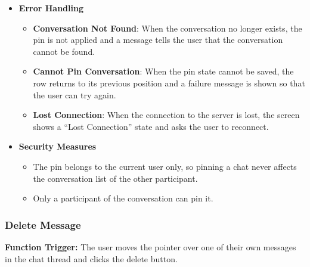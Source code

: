 \begin{itemize}[leftmargin=1.6em,topsep=4pt,itemsep=3pt,parsep=0pt,label=$\bullet$]
        \begin{itemize}[leftmargin=2.2em,topsep=2pt,itemsep=3pt,parsep=0pt,label=$\circ$]
            \item The pinned conversation stays at the top of the conversation list of the current user.
            \item The content of the conversation and the messages are not changed by this action.
        \end{itemize}
    \item \textbf{Error Handling}

        \begin{itemize}[leftmargin=2.2em,topsep=2pt,itemsep=3pt,parsep=0pt,label=$\circ$]
            \item \textbf{Conversation Not Found}: When the conversation no longer exists, the pin is not applied and a message tells the user that the conversation cannot be found.
            \item \textbf{Cannot Pin Conversation}: When the pin state cannot be saved, the row returns to its previous position and a failure message is shown so that the user can try again.
            \item \textbf{Lost Connection}: When the connection to the server is lost, the screen shows a ``Lost Connection'' state and asks the user to reconnect.
        \end{itemize}
    \item \textbf{Security Measures}

        \begin{itemize}[leftmargin=2.2em,topsep=2pt,itemsep=3pt,parsep=0pt,label=$\circ$]
            \item The pin belongs to the current user only, so pinning a chat never affects the conversation list of the other participant.
            \item Only a participant of the conversation can pin it.
        \end{itemize}
\end{itemize}


\subsubsection{Delete Message}

\textbf{Function Trigger:} The user moves the pointer over one of their own messages in the chat thread and clicks the delete button.

